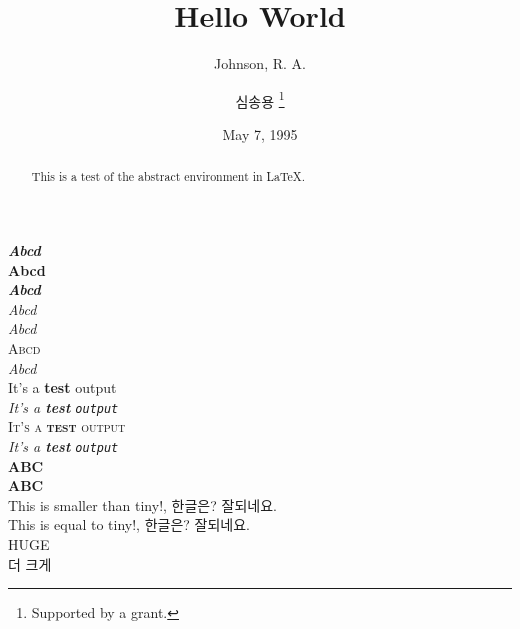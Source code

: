 \documentclass[11pt]{article}
\title{Hello World}
\author{Johnson, R. A. \and 심송용 \thanks{Supported by a grant.}}
\date{May 7, 1995}
\begin{document}
\maketitle

\begin{abstract}
This is a test of the abstract environment in \LaTeX.
\end{abstract}

{\bfseries\rmfamily\itshape Abcd} \\
{\bfseries\ttfamily\upshape Abcd} \\
{\bfseries\rmfamily\slshape Abcd} \\
{\mdseries\rmfamily\itshape Abcd} \\
{\mdseries\ttfamily\itshape Abcd} \\
{\mdseries\sffamily\scshape Abcd} \\
{\mdseries\sffamily\slshape Abcd} \\

\textup{It's a \textbf{test} \textrm{output}} \\
\textit{It's a \textbf{test} \texttt{output}} \\
\textsc{It's a \textbf{test} \textsf{output}} \\
\textsl{It's a \textbf{test} \texttt{output}}  \\
{\Large\bf ABC} \\
{\bf\Large ABC} \\
{\fontsize{2.5pt}{5pt}\selectfont This is smaller than tiny!, 한글은? 잘되네요.} \\
{\tiny This is equal to tiny!, 한글은? 잘되네요.} \\
{\fontsize{3.3cm}{3.8cm}\selectfont HUGE \\ 더 크게}
\end{document}
